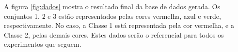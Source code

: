 A figura \ref{fig:dados} mostra o resultado final da base de dados gerada. Os conjuntos 1, 2 e 3 estão representados pelas cores vermelha, azul e verde, respectivamente. No caso, a Classe 1 está representada pela cor vermelha, e a Classe 2, pelas demais cores. Estes dados serão o referencial para todos os experimentos que seguem.




